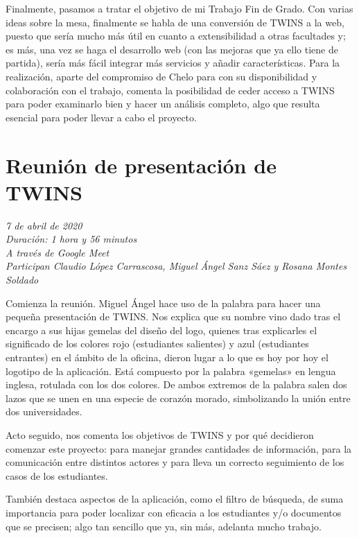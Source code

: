 	Finalmente, pasamos a tratar el objetivo de mi Trabajo Fin de Grado. Con varias ideas sobre la mesa, finalmente se habla de una conversión de TWINS a la web, puesto que sería mucho más útil en cuanto a extensibilidad a otras facultades y; es más, una vez se haga el desarrollo web (con las mejoras que ya ello tiene de partida), sería más fácil integrar más servicios y añadir características. Para la realización, aparte del compromiso de Chelo para con su disponibilidad y colaboración con el trabajo, comenta la posibilidad de ceder acceso a TWINS para poder examinarlo bien y hacer un análisis completo, algo que resulta esencial para poder llevar a cabo el proyecto.
	
	\section{Reunión de presentación de TWINS}
	\label{reunion3}
	
	\textit{7 de abril de 2020}\\
	
	\textit{Duración: 1 hora y 56 minutos}\\
	
	\textit{A través de Google Meet}\\
	
	\textit{Participan Claudio López Carrascosa, Miguel Ángel Sanz Sáez y Rosana Montes Soldado}
	
	Comienza la reunión. Miguel Ángel hace uso de la palabra para hacer una pequeña presentación de TWINS. Nos explica que su nombre vino dado tras el encargo a sus hijas gemelas del diseño del logo, quienes tras explicarles el significado de los colores rojo (estudiantes salientes) y azul (estudiantes entrantes) en el ámbito de la oficina, dieron lugar a lo que es hoy por hoy el logotipo de la aplicación. Está compuesto por la palabra «gemelas» en lengua inglesa, rotulada con los dos colores. De ambos extremos de la palabra salen dos lazos que se unen en una especie de corazón morado, simbolizando la unión entre dos universidades.
	
	Acto seguido, nos comenta los objetivos de TWINS y por qué decidieron comenzar este proyecto: para manejar grandes cantidades de información, para la comunicación entre distintos actores y para lleva un correcto seguimiento de los casos de los estudiantes.
	
	También destaca aspectos de la aplicación, como el filtro de búsqueda, de suma importancia para poder localizar con eficacia a los estudiantes y/o documentos que se precisen; algo tan sencillo que ya, sin más, adelanta mucho trabajo.
	
